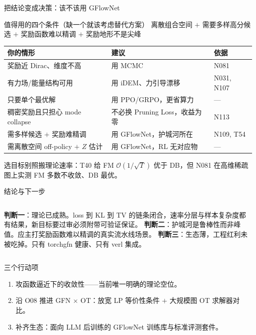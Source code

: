 \documentclass[aspectratio=169,10pt]{beamer}
\newcommand{\pos}[1]{\textcolor{positive}{#1}}
\newcommand{\con}[1]{\textcolor{negative}{#1}}
\begin{document}
\begin{frame}{把结论变成决策：该不该用 GFlowNet}
  \begin{exampleblock}{值得用的四个条件（缺一个就该考虑替代方案）}
    离散组合空间 $+$ 需要多样高分候选 $+$ 奖励函数难以精调 $+$ 奖励地形不是尖峰
  \end{exampleblock}
  \vspace{2pt}
  \begin{center}
  \begin{tabular}{p{5.3cm}p{4.4cm}l}
    \toprule
    你的情形 & 建议 & 依据 \\
    \midrule
    奖励近 Dirac、维度不高 & 用 MCMC & N081 \\
    有力场/能量结构可用 & 用 iDEM、力引导漂移 & N031, N107 \\
    只要单个最优解 & 用 PPO/GRPO，更省算力 & --- \\
    稠密奖励且只担心 mode collapse & 不必换 Pruning Loss，收益为零 & N113 \\
    需多样候选 $+$ 奖励难精调 & \pos{用 GFlowNet}，护城河所在 & N109, T54 \\
    需离散空间 off-policy $+$ $Z$ 估计 & \pos{用 GFlowNet}，RL 无对应物 & --- \\
    \bottomrule
  \end{tabular}
  \end{center}
  \vspace{2pt}
  选目标别照搬理论速率：T40 给 FM $\mathcal{O}(1/\sqrt{T})$ 优于 DB，但 N081 在高维稀疏图上实测 \con{FM 多数不收敛、DB 最优}。
\end{frame}

\begin{frame}{结论与下一步}
  \begin{columns}[T]
      \textbf{判断一}：理论已成熟。loss 到 KL 到 TV 的链条闭合，速率分层与样本复杂度都有结果，新目标要过审必须附带可验证保证。
      \textbf{判断二}：护城河是鲁棒性而非峰值。应主打奖励函数难以精调的真实流水线场景。
      \textbf{判断三}：生态薄，工程红利未被吃掉。只有 torchgfn 健康、只有 verl 集成。
  \end{columns}

  \vspace{10pt}
  \begin{alertblock}{三个行动项}
    \begin{enumerate}
      \item 攻函数逼近下的收敛性——当前唯一明确的理论空位。
      \item 沿 O08 推进 GFN $\times$ OT：放宽 LP 等价性条件 $+$ 大规模图 OT 求解器对比。
      \item 补齐生态：面向 LLM 后训练的 GFlowNet 训练库与标准评测套件。
    \end{enumerate}
  \end{alertblock}
\end{frame}
\end{document}
